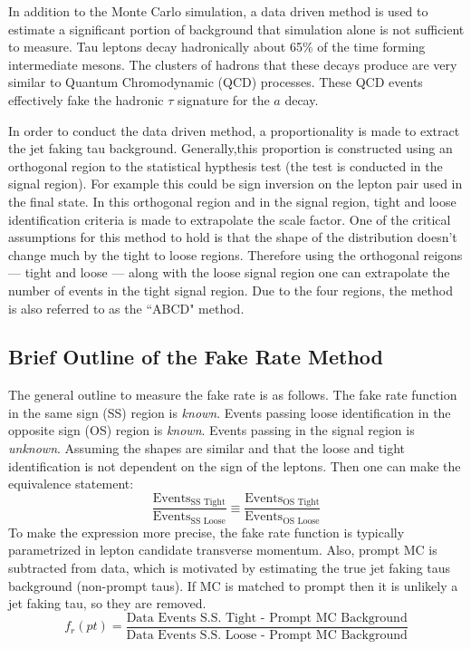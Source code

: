 In addition to the Monte Carlo simulation, a data driven method is used to estimate a significant portion of background that simulation alone is not sufficient to measure. Tau leptons decay hadronically about 65\% of the time forming intermediate mesons. The clusters of hadrons that these decays produce are very similar to Quantum Chromodynamic (QCD) processes. These QCD events effectively fake the hadronic $\tau$ signature for the $a$ decay. 

In order to conduct the data driven method, a proportionality is made to extract the jet faking tau background. Generally,this proportion is constructed using an orthogonal region to the statistical hypthesis test (the test is conducted in the signal region). For example this could be sign inversion on the lepton pair used in the final state. In this orthogonal region and in the signal region, tight and loose identification criteria is made to extrapolate the scale factor. One of the critical assumptions for this method to hold is that the shape of the distribution doesn't change much by the tight to loose regions. Therefore using the orthogonal reigons --- tight and loose --- along with the loose signal region one can extrapolate the number of events in the tight signal region. Due to the four regions, the method is also referred to as the ``ABCD" method. 


\subsection{Brief Outline of the Fake Rate Method}
The general outline to measure the fake rate is as follows.
The fake rate function in the same sign (SS) region is \textit{known}.
Events passing loose identification in the opposite sign (OS) region is \textit{known}.
Events passing in the signal region is \textit{unknown}. 
Assuming the shapes are similar and that the loose and tight identification is not dependent on the sign of the leptons. Then one can make the equivalence statement: 
\begin{equation}
\label{eq:abcd}
\frac{\text{Events}_\text{SS Tight}}{\text{Events}_\text{SS Loose}} \equiv \frac{\text{Events}_\text{OS Tight}}{\text{Events}_\text{OS Loose}}
\end{equation}
To make the expression more precise, the fake rate function is typically parametrized in lepton candidate transverse momentum. 
 Also, prompt MC is subtracted from data, which is motivated by estimating the true jet faking taus background (non-prompt taus). If MC is matched to prompt then it is unlikely a jet faking tau, so they are removed. 
\[f_r(pt)=\frac{\text{Data Events S.S. Tight - Prompt MC Background}}{\text{Data Events S.S. Loose - Prompt MC Background}}\] 

